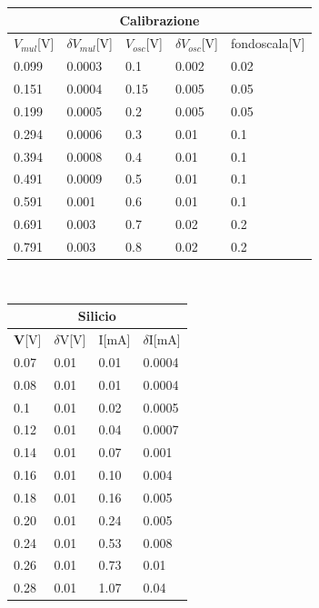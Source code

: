 \documentclass{amsart}
\begin{document}
    \begin{center}
        \begin{tabular}{|p{2cm}|p{2cm}|p{2cm}|p{2cm}|p{2cm}|}
            \hline
            \multicolumn{5}{|c|}{Calibrazione}\\
            \hline
            $V_{mul}$[V] & $\delta V_{mul}$[V] & $V_{osc}$[V] & $\delta V_{osc}$[V] & fondoscala[V]\\
            \hline
            0.099 & 0.0003 & 0.1 & 0.002 & 0.02\\
            0.151 & 0.0004 & 0.15 & 0.005 & 0.05\\
            0.199 & 0.0005 & 0.2 & 0.005 & 0.05\\
            0.294 & 0.0006 & 0.3 & 0.01 & 0.1\\
            0.394 & 0.0008 & 0.4 & 0.01 & 0.1\\
            0.491 & 0.0009 & 0.5 & 0.01 & 0.1\\
            0.591 & 0.001 & 0.6 & 0.01 & 0.1\\
            0.691 & 0.003 & 0.7 & 0.02 & 0.2\\
            0.791 & 0.003 & 0.8 & 0.02 & 0.2\\
            \hline
        \end{tabular}\\
        \vspace{0.2cm}
        \begin{tabular}{|p{1cm}|p{1cm}|p{1cm}|p{1cm}|}
            \hline
            \multicolumn{4}{|c|}{Silicio}\\
            \hline
            \textbf V[V] & $\delta$V[V] & I[mA] & $\delta$I[mA] \\
            \hline
            0.07 & 0.01 & 0.01 & 0.0004\\
            0.08 & 0.01 & 0.01 & 0.0004\\
            0.1  & 0.01 & 0.02 & 0.0005\\
            0.12 & 0.01 & 0.04 & 0.0007\\
            0.14 & 0.01 & 0.07 & 0.001\\
            0.16 & 0.01 & 0.10 & 0.004\\
            0.18 & 0.01 & 0.16 & 0.005\\
            0.20 & 0.01 & 0.24 & 0.005\\
            0.24 & 0.01 & 0.53 & 0.008\\
            0.26 & 0.01 & 0.73 & 0.01\\
            0.28 & 0.01 & 1.07 & 0.04\\

\end{tabular}
\end{center}
\end{document}
